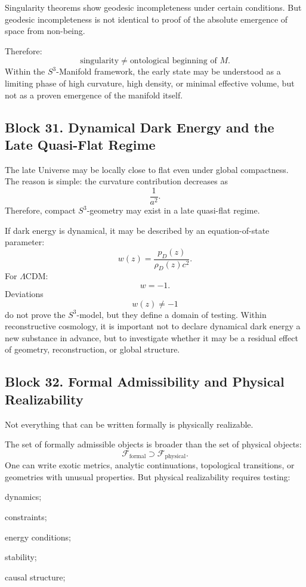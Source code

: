 \documentclass[12pt,a4paper]{article}
\theoremstyle{definition}
\begin{document}
Singularity theorems show geodesic incompleteness under certain conditions. But geodesic incompleteness is not identical to proof of the absolute emergence of space from non-being.

Therefore:
\[
\text{singularity}
\neq
\text{ontological beginning of }M.
\]
Within the \(S^3\)-Manifold framework, the early state may be understood as a limiting phase of high curvature, high density, or minimal effective volume, but not as a proven emergence of the manifold itself.



\subsection{Block 31. Dynamical Dark Energy and the Late Quasi-Flat Regime}
The late Universe may be locally close to flat even under global compactness. The reason is simple: the curvature contribution decreases as
\[
\frac{1}{a^2}.
\]
Therefore, compact \(S^3\)-geometry may exist in a late quasi-flat regime.

If dark energy is dynamical, it may be described by an equation-of-state parameter:
\[
w(z)=\frac{p_D(z)}{\rho_D(z)c^2}.
\]
For \(\Lambda\)CDM:
\[
w=-1.
\]
Deviations
\[
w(z)\neq -1
\]
do not prove the \(S^3\)-model, but they define a domain of testing. Within reconstructive cosmology, it is important not to declare dynamical dark energy a new substance in advance, but to investigate whether it may be a residual effect of geometry, reconstruction, or global structure.



\subsection{Block 32. Formal Admissibility and Physical Realizability}
Not everything that can be written formally is physically realizable.

The set of formally admissible objects is broader than the set of physical objects:
\[
\mathcal F_{\mathrm{formal}}
\supset
\mathcal F_{\mathrm{physical}}.
\]
One can write exotic metrics, analytic continuations, topological transitions, or geometries with unusual properties. But physical realizability requires testing:

dynamics;

constraints;

energy conditions;

stability;

causal structure;
\end{document}
